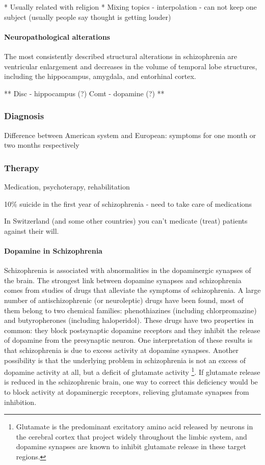 \documentclass[12pt,article,oneside,a4paper]{memoir}
\begin{document}
* Usually related with religion
* Mixing topics - interpolation - can not keep one subject (usually people say thought is getting louder)

\paragraph{Neuropathological alterations}
The most consistently described structural alterations in schizophrenia are ventricular enlargement and decreases in the volume of temporal lobe structures, including the hippocampus, amygdala, and entorhinal cortex.

**
Disc - hippocampus (?)
Comt - dopamine (?)
**

\subsubsection{Diagnosis}
Difference between American system and European: symptoms for one month or two months respectively

\subsubsection{Therapy}
Medication, psychoterapy, rehabilitation

10\% suicide in the first year of schizophrenia - need to take care of medications

In Switzerland (and some other countries) you can't medicate (treat) patients against their will.


\paragraph{Dopamine in Schizophrenia}
Schizophrenia is associated with abnormalities in the dopaminergic synapses of the brain. The strongest link between dopamine synapses and schizophrenia comes from studies of drugs that alleviate the symptoms of schizophrenia.
A large number of antischizophrenic (or neuroleptic) drugs have been found, most of them belong to two chemical families: phenothiazines (including chlorpromazine) and butyropherones (including haloperidol). These drugs have two properties in common: they block postsynaptic dopamine receptors and they inhibit the release of dopamine from the presynaptic neuron. One interpretation of these results is that schizophrenia is due to excess activity at dopamine synapses. Another possibility is that the underlying problem in schizophrenia is not an excess of dopamine activity at all, but a deficit of glutamate activity \footnote{Glutamate is the predominant excitatory amino acid released by neurons in the cerebral cortex that project widely throughout the limbic system, and dopamine synapses are known to inhibit glutamate release in these target regions.}. If glutamate release is reduced in the schizophrenic brain, one way to correct this deficiency would be to block activity at dopaminergic receptors, relieving glutamate synapses from inhibition.
\end{document}
